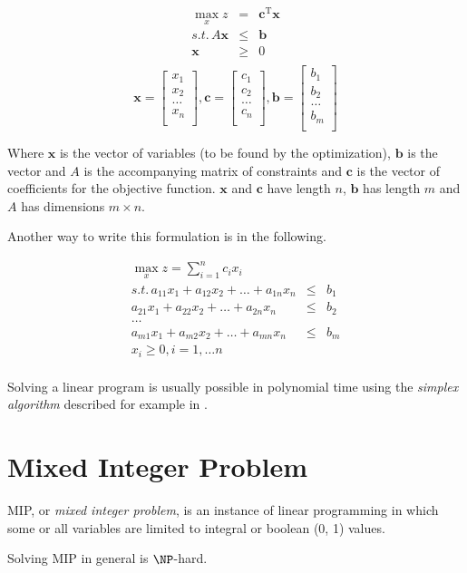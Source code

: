 \begin{eqnarray*}
\max_{x} z & = & \mathbf{c}^{\mathrm{T}}\mathbf{x} \\
s.t.\, A\mathbf{x} & \leqslant & \mathbf{b} \\
\mathbf{x} & \geqslant & 0 \\
\end{eqnarray*}
\[
\mathbf{x} =
\begin{bmatrix}
x_1 \\
x_2 \\
\ldots \\
x_n \\
\end{bmatrix},
\mathbf{c} = 
\begin{bmatrix}
c_1 \\
c_2 \\
\ldots \\
c_n \\
\end{bmatrix},
\mathbf{b} =
\begin{bmatrix}
b_1 \\
b_2 \\
\ldots \\
b_m \\
\end{bmatrix}
\]

Where $\mathbf{x}$ is the vector of variables (to be found by the optimization), $\mathbf{b}$ is the vector and $A$ is the accompanying matrix of constraints and $\mathbf{c}$ is the vector of coefficients for the objective function. $\mathbf{x}$ and $\mathbf{c}$ have length $n$, $\mathbf{b}$ has length $m$ and $A$ has dimensions $m \times n$.

Another way to write this formulation is in the following.

\begin{eqnarray*}
\max_{x} z = \sum_{i=1}^{n} c_i x_i \\
s.t.\, a_{11}x_{1} + a_{12}x_{2} + \ldots + a_{1n}x_{n} & \leqslant & b_{1} \\
	   a_{21}x_{1} + a_{22}x_{2} + \ldots + a_{2n}x_{n} & \leqslant & b_{2} \\
	   \ldots \\
	   a_{m1}x_{1} + a_{m2}x_{2} + \ldots + a_{mn}x_{n} & \leqslant & b_{m} \\
	   x_i \geqslant 0, i = 1, \ldots n \\
\end{eqnarray*}

Solving a linear program is usually possible in polynomial time using the \textit{simplex algorithm} described for example in \cite{dantzig1998linear}.

\section{Mixed Integer Problem}

\begin{define}
	MIP, or \textit{mixed integer problem}, is an instance of linear programming in which some or all variables are limited to integral or boolean (0, 1) values.
\end{define}

Solving MIP in general is $\NP$-hard.